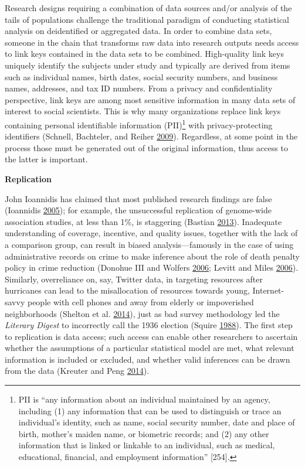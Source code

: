 \documentclass[]{krantz}
\begin{document}
Research designs requiring a combination of data sources and/or analysis
of the tails of populations challenge the traditional paradigm of
conducting statistical analysis on deidentified or aggregated data. In
order to combine data sets, someone in the chain that transforms raw
data into research outputs needs access to link keys contained in the
data sets to be combined. High-quality link keys uniquely identify the
subjects under study and typically are derived from items such as
individual names, birth dates, social security numbers, and business
names, addresses, and tax ID numbers. From a privacy and confidentiality
perspective, link keys are among most sensitive information in many data
sets of interest to social scientists. This is why many organizations
replace link keys containing personal identifiable information
(PII)\footnote{PII is ``any information about an individual maintained
  by an agency, including (1) any information that can be used to
  distinguish or trace an individual's identity, such as name, social
  security number, date and place of birth, mother's maiden name, or
  biometric records; and (2) any other information that is linked or
  linkable to an individual, such as medical, educational, financial,
  and employment information'' {[}254{]}.} with privacy-protecting
identifiers (Schnell, Bachteler, and Reiher
\protect\hyperlink{ref-schnell2009privacy}{2009}). Regardless, at some
point in the process those must be generated out of the original
information, thus access to the latter is important.

\textbf{Replication}

John Ioannidis has claimed that most published research findings are
false (Ioannidis \protect\hyperlink{ref-Ioannidis2005}{2005}); for
example, the unsuccessful replication of genome-wide association
studies, at less than 1\%, is staggering (Bastian
\protect\hyperlink{ref-Bastian2013}{2013}). Inadequate understanding of
coverage, incentive, and quality issues, together with the lack of a
comparison group, can result in biased analysis---famously in the case
of using administrative records on crime to make inference about the
role of death penalty policy in crime reduction (Donohue III and Wolfers
\protect\hyperlink{ref-donohue2006uses}{2006}; Levitt and Miles
\protect\hyperlink{ref-levitt2006economic}{2006}). Similarly,
overreliance on, say, Twitter data, in targeting resources after
hurricanes can lead to the misallocation of resources towards young,
Internet-savvy people with cell phones and away from elderly or
impoverished neighborhoods (Shelton et al.
\protect\hyperlink{ref-shelton2014mapping}{2014}), just as bad survey
methodology led the \emph{Literary Digest} to incorrectly call the 1936
election (Squire \protect\hyperlink{ref-squire19881936}{1988}). The
first step to replication is data access; such access can enable other
researchers to ascertain whether the assumptions of a particular
statistical model are met, what relevant information is included or
excluded, and whether valid inferences can be drawn from the data
(Kreuter and Peng \protect\hyperlink{ref-kreuter201412}{2014}).
\end{document}
